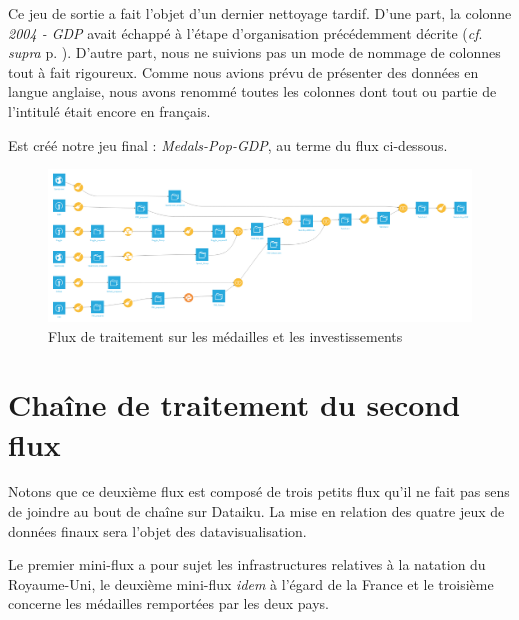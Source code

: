 \documentclass[hidelinks, 12pt]{report}
\begin{document}
Ce jeu de sortie a fait l'objet d'un dernier nettoyage tardif. D'une part, la colonne \textit{2004 - GDP} avait échappé à l'étape d'organisation précédemment décrite (\textit{cf}. \textit{supra} p. \pageref{orga}). D'autre part, nous ne suivions pas un mode de nommage de colonnes tout à fait rigoureux. Comme nous avions prévu de présenter des données en langue anglaise, nous avons renommé toutes les colonnes dont tout ou partie de l'intitulé était encore en français.

Est créé notre jeu final : \textit{Medals-Pop-GDP}, au terme du flux ci-dessous.

\begin{center}
	\begin{figure}[H]
		\setlength{\belowcaptionskip}{-35pt}
		\includegraphics[scale=0.35]{images/flow-medals-full.png}
		\caption{Flux de traitement sur les médailles et les investissements}
	\end{figure}
\end{center}





%





\section{Chaîne de traitement du second flux}

Notons que ce deuxième flux est composé de trois petits flux qu'il ne fait pas sens de joindre au bout de chaîne sur Dataiku. La mise en relation des quatre jeux de données finaux sera l'objet des datavisualisation.

Le premier mini-flux a pour sujet les infrastructures relatives à la natation du Royaume-Uni, le deuxième mini-flux \textit{idem} à l'égard de la France et le troisième concerne les médailles remportées par les deux pays.
\end{document}
